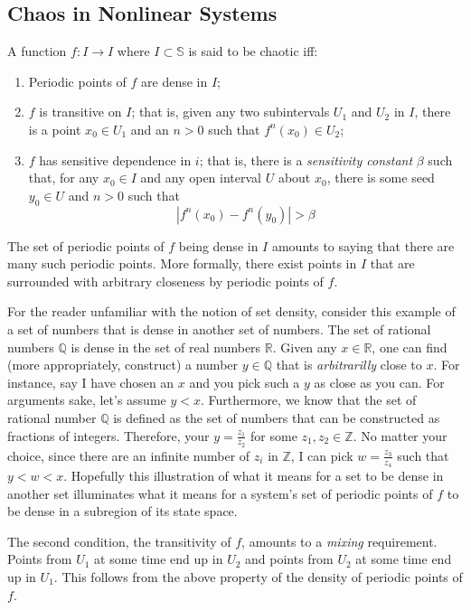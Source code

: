 \documentclass{elsart}
\begin{document}
\subsection{Chaos in Nonlinear Systems}
A function $f : I \rightarrow I$ where $I \subset \mathbb{S}$ is said to be chaotic iff:\cite{hirsch}
\begin{enumerate}
\item Periodic points of $f$ are dense in $I$;
\item $f$ is transitive on $I$;  that is, given any two subintervals $U_{1}$
and $U_{2}$ in $I$, there is a point $x_{0} \in U_{1}$ and an $n > 0$ such 
that $f^{n}(x_{0}) \in U_{2}$;
\item $f$ has sensitive dependence in $i$; that is, there is a
\textit{sensitivity constant} $\beta$ such that, for any $x_{0} \in I$ and
any open interval $U$ about $x_{0}$, there is some seed $y_{0} \in U$ and 
$n > 0$ such that
$$|f^{n}(x_{0}) - f^{n}(y_{0})| > \beta$$
\end{enumerate}

The set of periodic points of $f$ being dense in $I$ amounts to saying that
there are many such periodic points.  More formally, there exist points in $I$
that are surrounded with arbitrary closeness by periodic points of $f$.

For the reader unfamiliar with the notion of set density, consider
this example of a set of numbers that is dense in another set of numbers.
The set of rational numbers $\mathbb{Q}$ is dense in the set of real numbers 
$\mathbb{R}$.  Given any $x \in \mathbb{R}$, one can find (more 
appropriately, construct) a number $y \in \mathbb{Q}$ that is 
\textit{arbitrarilly} close to $x$.  For instance, say I have chosen an $x$
and you pick such a $y$ as close as you can.
For arguments sake, let's assume $y < x$.  Furthermore, we know that
the set of rational number $\mathbb{Q}$ is defined as the set of numbers
that can be constructed as fractions of integers.  Therefore, your 
$y = \frac{z_{1}}{z_{2}}$ for some $z_{1}, z_{2} \in \mathbb{Z}$.  No matter
your choice, since there are an infinite number of $z_{i}$ in $\mathbb{Z}$,
I can pick $w = \frac{z_{3}}{z_{4}}$ such that $y < w < x$.  Hopefully
this illustration of what it means for a set to be dense in another set
illuminates what it means for a system's set of periodic points of $f$ to be
dense in a subregion of its state space.

The second condition, the transitivity of $f$, amounts to a \textit{mixing} 
requirement.  Points from $U_{1}$ at some time end up in $U_{2}$ and points 
from $U_{2}$ at some time end up in $U_{1}$.  This follows from the above 
property of the density of periodic points of $f$.
\end{document}
